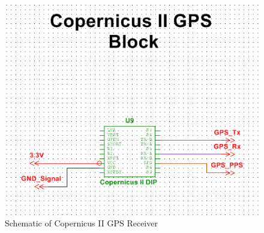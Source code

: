 \begin{figure}[h]
\centering
\includegraphics[width=\textwidth,height=\textheight,keepaspectratio]{./KIRBY_Images/Multisim_GPS}
\caption{Schematic of Copernicus II GPS Receiver}
\label{fig:Schematic_Copernicus}
\end{figure}

